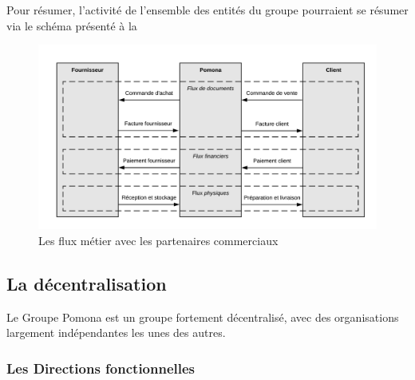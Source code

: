         Pour résumer, l'activité de l'ensemble des entités du groupe pourraient se résumer via le schéma présenté à la 

        \begin{figure}[htbp]
            \begin{center}
            \includegraphics[width=\linewidth]{img/Les flux metier de Pomona.png}
            \end{center}
            \caption{Les flux métier avec les partenaires commerciaux}
            \label{fig:flux metier}
        \end{figure}


        \subsection{La décentralisation}
        
        Le Groupe Pomona est un groupe fortement décentralisé, avec des organisations largement indépendantes les unes des autres. 

            \subsubsection{Les Directions fonctionnelles}
            \label{les_directions_fonctionnelles}


